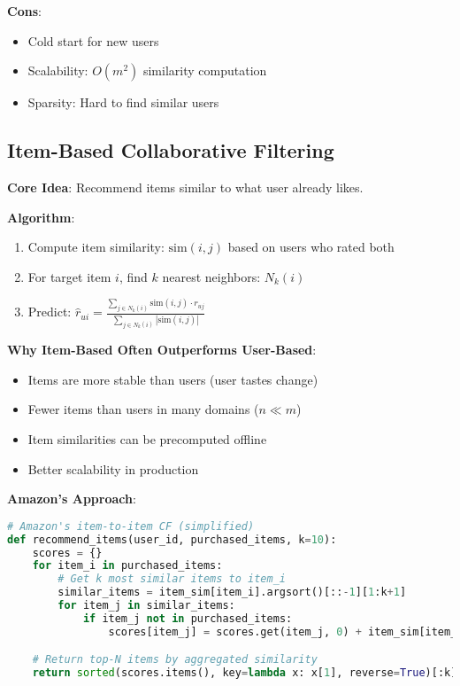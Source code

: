 \documentclass[10pt]{article}
\begin{document}
\textbf{Cons}:
\begin{itemize}[leftmargin=*]
    \item Cold start for new users
    \item Scalability: $O(m^2)$ similarity computation
    \item Sparsity: Hard to find similar users
\end{itemize}

\subsection{Item-Based Collaborative Filtering}

\textbf{Core Idea}: Recommend items similar to what user already likes.

\textbf{Algorithm}:
\begin{enumerate}[leftmargin=*]
    \item Compute item similarity: $\text{sim}(i, j)$ based on users who rated both
    \item For target item $i$, find $k$ nearest neighbors: $N_k(i)$
    \item Predict: $\hat{r}_{ui} = \frac{\sum_{j \in N_k(i)} \text{sim}(i,j) \cdot r_{uj}}{\sum_{j \in N_k(i)} |\text{sim}(i,j)|}$
\end{enumerate}

\textbf{Why Item-Based Often Outperforms User-Based}:
\begin{itemize}[leftmargin=*]
    \item Items are more stable than users (user tastes change)
    \item Fewer items than users in many domains ($n \ll m$)
    \item Item similarities can be precomputed offline
    \item Better scalability in production
\end{itemize}

\textbf{Amazon's Approach}:
\begin{lstlisting}[language=Python]
# Amazon's item-to-item CF (simplified)
def recommend_items(user_id, purchased_items, k=10):
    scores = {}
    for item_i in purchased_items:
        # Get k most similar items to item_i
        similar_items = item_sim[item_i].argsort()[::-1][1:k+1]
        for item_j in similar_items:
            if item_j not in purchased_items:
                scores[item_j] = scores.get(item_j, 0) + item_sim[item_i, item_j]

    # Return top-N items by aggregated similarity
    return sorted(scores.items(), key=lambda x: x[1], reverse=True)[:k]
\end{lstlisting}
\end{document}
